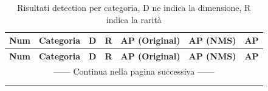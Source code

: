 \begin{center}
\begin{longtable}{|c|l|c|c|c|c|c|}

\hline \multicolumn{1}{|c|}{\textbf{Num}} &
\multicolumn{1}{c|}{\textbf{Categoria}} & \multicolumn{1}{c|}{\textbf{D}} & \multicolumn{1}{c|}{\textbf{R}} & \multicolumn{1}{c|}{\textbf{AP (Original)}} &\multicolumn{1}{c|}{\textbf{AP (NMS)}} &\multicolumn{1}{c|}{\textbf{AP}} \\ \hline\endfirsthead

\hline \multicolumn{1}{|c|}{\textbf{Num}} &
\multicolumn{1}{c|}{\textbf{Categoria}} & \multicolumn{1}{c|}{\textbf{D}} & \multicolumn{1}{c|}{\textbf{R}} &\multicolumn{1}{c|}{\textbf{AP (Original)}} &\multicolumn{1}{c|}{\textbf{AP (NMS)}} &\multicolumn{1}{c|}{\textbf{AP}}\\ \hline \endhead

\hline \multicolumn{7}{|c|}{{------ Continua nella pagina successiva ------}} \\ \hline
\endfoot

\hline

\caption{Risultati detection per categoria, D ne indica la dimensione, R indica la rarità}
\label{risultati detection per categoria} \\

\endlastfoot



\end{longtable}
\end{center}
